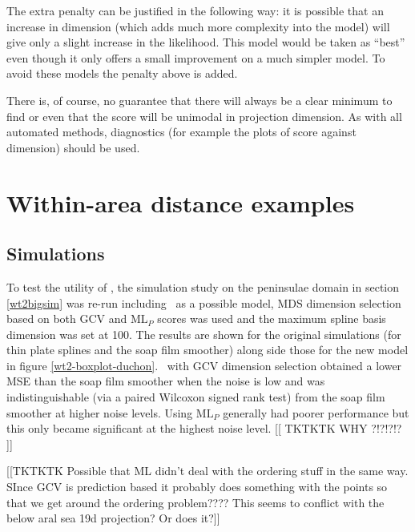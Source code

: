 The extra penalty can be justified in the following way: it is possible that an increase in dimension (which adds much more complexity into the model) will give only a slight increase in the likelihood. This model would be taken as ``best'' even though it only offers a small improvement on a much simpler model. To avoid these models the penalty above is added.

There is, of course, no guarantee that there will always be a clear minimum to find or even that the score will be unimodal in projection dimension. As with all automated methods, diagnostics (for example the plots of score against dimension) should be used.

\section{Within-area distance examples}
\label{gds-wad-examples}
\subsection{Simulations}

To test the utility of \mdsds, the simulation study on the peninsulae domain in section \ref{wt2bigsim} was re-run including \mdsds\ as a possible model, MDS dimension selection based on both GCV and $\text{ML}_P$ scores was used and the maximum spline basis dimension was set at 100. The results are shown for the original simulations (for thin plate splines and the soap film smoother) along side those for the new model in figure \ref{wt2-boxplot-duchon}. \mdsds\ with GCV dimension selection obtained a lower MSE than the soap film smoother when the noise is low and was indistinguishable (via a paired Wilcoxon signed rank test) from the soap film smoother at higher noise levels. Using $\text{ML}_P$ generally had poorer performance but this only became significant at the highest noise level. [[ TKTKTK WHY ?!?!?!? ]]

[[TKTKTK Possible that ML didn't deal with the ordering stuff in the same way. SInce GCV is prediction based it probably does something with the points so that we get around the ordering problem???? This seems to conflict with the below aral sea 19d projection? Or does it?]]

